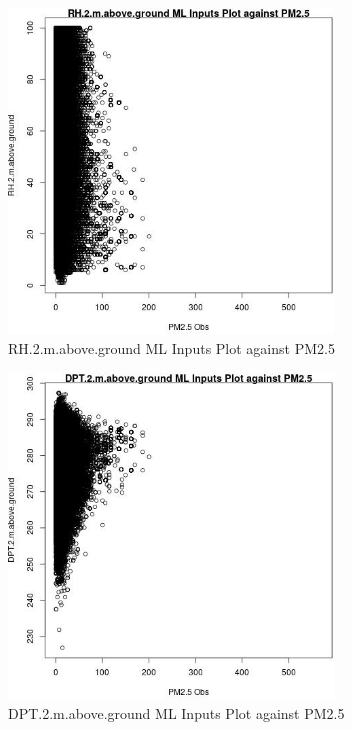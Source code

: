 \clearpage 

\begin{figure} 
\centering  
\includegraphics[width=0.77\textwidth]{Code_Outputs/ML_input_report_ML_input_PM25_Step5_part_d_de_duplicated_aves_ML_input_RH2mabovegroundvPM25_Obs.jpg} 
\caption{\label{fig:ML_input_report_ML_input_PM25_Step5_part_d_de_duplicated_aves_ML_inputRH2mabovegroundvPM25_Obs}RH.2.m.above.ground ML Inputs Plot against PM2.5} 
\end{figure} 
 

\begin{figure} 
\centering  
\includegraphics[width=0.77\textwidth]{Code_Outputs/ML_input_report_ML_input_PM25_Step5_part_d_de_duplicated_aves_ML_input_DPT2mabovegroundvPM25_Obs.jpg} 
\caption{\label{fig:ML_input_report_ML_input_PM25_Step5_part_d_de_duplicated_aves_ML_inputDPT2mabovegroundvPM25_Obs}DPT.2.m.above.ground ML Inputs Plot against PM2.5} 
\end{figure} 
 

